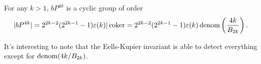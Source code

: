 
\begin{theorem}
	For any $k>1$, $bP^{4k}$ is a cyclic group of order
	\[
	|bP^{4k}|=2^{2k-2}(2^{2k-1}-1)\varepsilon(k)|\operatorname{coker} =2^{2k-2}(2^{2k-1}-1)\varepsilon(k)\operatorname{denom}\left(\frac{4k}{B_{2k}}\right).
	\]
\end{theorem}

\begin{remark}
	It's interesting to note that the Eells-Kupier invariant is able to detect everything except for $\operatorname{denom}(4k/B_{2k})$. 
\end{remark}
%
%
%
%
%
